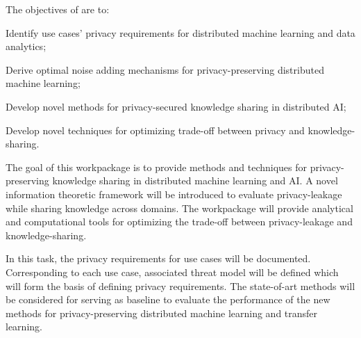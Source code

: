 \addtocounter{wpno}{1}
\begin{Workpackage}{\thewpno}
\begin{WPObjectives}
The objectives of \theWP{} are to:
\begin{compactitem}
\item Identify use cases' privacy requirements for distributed machine learning and data analytics;
\item Derive optimal noise adding mechanisms for privacy-preserving distributed machine learning; 
\item Develop novel methods for privacy-secured knowledge sharing in distributed AI;
\item Develop novel techniques for optimizing trade-off between privacy and knowledge-sharing.  
\end{compactitem}
\end{WPObjectives}

\begin{WPDescription}
  The goal of this workpackage is to provide methods and techniques for privacy-preserving knowledge sharing in distributed machine learning and AI. A novel information theoretic framework will be introduced to evaluate privacy-leakage while sharing knowledge across domains. The workpackage will provide analytical and computational tools for optimizing the trade-off between privacy-leakage and knowledge-sharing.        
\end{WPDescription}

\begin{Task}

\TaskResults{%
}
\TaskHeader{}
In this task, the privacy requirements for use cases will be documented. Corresponding to each use case, associated threat model will be defined which will form the basis of defining privacy requirements. The state-of-art methods will be considered for serving as baseline to evaluate the performance of the new methods for privacy-preserving distributed machine learning and transfer learning.  
 \end{Task}

 \begin{Task}
 

\end{Task}
\end{Workpackage}
